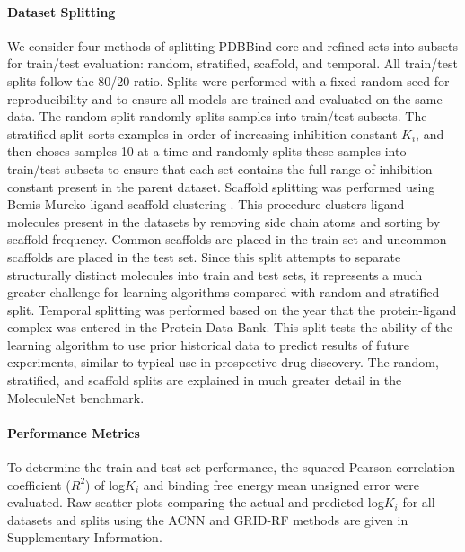 \paragraph{Dataset Splitting}
We consider four methods of splitting PDBBind core and refined sets into subsets for train/test evaluation: random, stratified, scaffold, and temporal. All train/test splits follow the 80/20 ratio.  Splits were performed with a fixed random seed for reproducibility and to ensure all models are trained and evaluated on the same data.  The random split randomly splits samples into train/test subsets.  The stratified split sorts examples in order of increasing inhibition constant $K_i$, and then choses samples 10 at a time and randomly splits these samples into train/test subsets to ensure that each set contains the full range of inhibition constant present in the parent dataset.  Scaffold splitting was performed using Bemis-Murcko ligand scaffold clustering \cite{bemis1996properties}.  This procedure clusters ligand molecules present in the datasets by removing side chain atoms and sorting by scaffold frequency.  Common scaffolds are placed in the train set and uncommon scaffolds are placed in the test set.  Since this split attempts to separate structurally distinct molecules into train and test sets, it represents a much greater challenge for learning algorithms compared with random and stratified split.  Temporal splitting was performed based on the year that the protein-ligand complex was entered in the Protein Data Bank.  This split tests the ability of the learning algorithm to use prior historical data to predict results of future experiments, similar to typical use in prospective drug discovery.  The random, stratified, and scaffold splits are explained in much greater detail in the MoleculeNet\cite{wu2017moleculenet} benchmark.

\paragraph{Performance Metrics}
To determine the train and test set performance, the squared Pearson correlation coefficient ($R^2$) of log$K_i$ and binding free energy mean unsigned error were evaluated.  Raw scatter plots comparing the actual and predicted log$K_i$ for all datasets and splits using the ACNN and GRID-RF methods are given in Supplementary Information.

